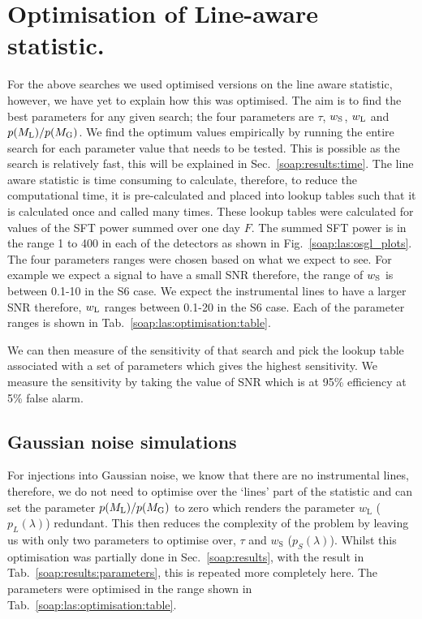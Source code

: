 \section{\label{soap:las:optimisation}Optimisation of Line-aware statistic.}

For the above searches we used optimised versions on the line aware statistic,
however, we have yet to explain how this was optimised.  The aim is to find the
best parameters for any given search; the four parameters are
$\tau$, $w_{\rm{S}}$, $w_{\rm{L}}$ and $p(M_{\rm{L}})/p(M_{\rm{G}})$.  We find
the optimum values empirically by running the entire search for each parameter
value that needs to be tested. This is possible as the search is relatively
fast, this will be explained in Sec.~\ref{soap:results:time}.  The line aware
statistic is time consuming to calculate, therefore, to reduce the
computational time, it is pre-calculated and placed into lookup tables such
that it is calculated once and called many times.  These lookup tables were
calculated for values of the \gls{SFT} power summed over one day $F$. The summed \gls{SFT} power is in the range 1 to 400 in each of the detectors as shown in Fig.~\ref{soap:las:osgl_plots}.
The four parameters ranges were chosen based on what we expect to see.
For example we expect a signal to have a small \gls{SNR} therefore, the range of $w_{\rm{S}}$ is between 0.1-10 in the S6 case.
We expect the instrumental lines to have a larger \gls{SNR} therefore, $w_{\rm{L}}$ ranges between 0.1-20 in the S6 case. Each of the parameter ranges is shown in Tab.~\ref{soap:las:optimisation:table}.

We can then measure of the sensitivity of that search and pick the lookup table associated with a set of parameters which gives the highest sensitivity. 
We measure the sensitivity by taking the value of \gls{SNR} which is at 95\% efficiency at 5\% false alarm. 

\subsection{\label{soap:las:optimisation:gauss}Gaussian noise simulations}

For injections into Gaussian noise, we know that there are no instrumental
lines, therefore, we do not need to optimise over the `lines' part of the
statistic and can set the parameter $p(M_{\rm{L}})/p(M_{\rm{G}})$ to zero which renders the
parameter $w_{\text{L}}$ ($p_L(\lambda)$) redundant. 
This then reduces the complexity of the problem by leaving us with only two parameters to optimise over, $\tau$ and $w_{\text{S}}$ ($p_S(\lambda)$). 
Whilst this optimisation was partially done in Sec.~\ref{soap:results}, with the result in Tab.~\ref{soap:results:parameters}, this is repeated more completely here.
The parameters were optimised in the range shown in Tab.~\ref{soap:las:optimisation:table}. 

